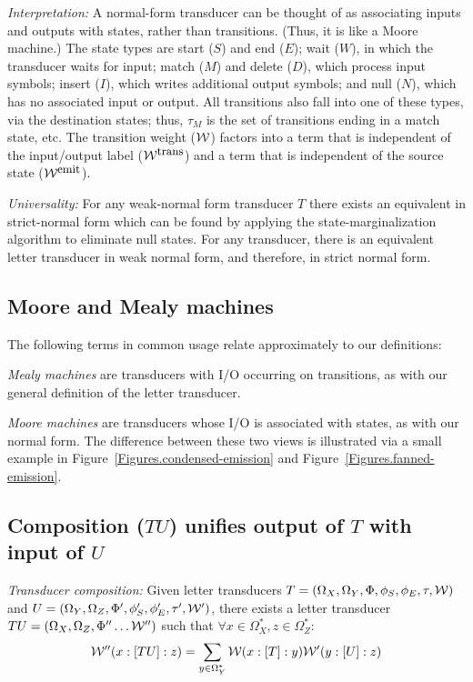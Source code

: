 \documentclass{article}
\newcommand{\seclabel}[1]{\label{sec.#1}}
\newcommand{\figref}[1]{Figure~\ref{Figures.#1}}
\newcommand\wtrans[4]{#1(#2 : [#3] : #4)}
\newcommand\compose{}
\newcommand\States{\Phi}
\newcommand\Transitions{\tau}
\newcommand\startstate{\phi_S}
\newcommand\laststate{\phi_E}
\newcommand\weight{{\cal W}}
\newcommand\weightfunof[1]{\weight_{#1}}
\newcommand\transweightfun[1]{\weightfunof{#1}^{\mbox{\small trans}}}
\newcommand\emitweightfun[1]{\weightfunof{#1}^{\mbox{\small emit}}}
\begin{document}
{\em Interpretation:}
A normal-form transducer can be thought of as associating inputs and outputs with states, rather than transitions.
(Thus, it is like a Moore machine.)
The state types are
 start ($S$) and end ($E$);
 wait ($W$), in which the transducer waits for input;
 match ($M$) and delete ($D$), which process input symbols;
 insert ($I$), which writes additional output symbols; and
 null ($N$), which has no associated input or output.
All transitions also fall into one of these types, via the destination states;
thus, $\Transitions_M$ is the set of transitions ending in a match state, etc.
The transition weight ($\weight$) factors into a term that is independent of the input/output label ($\transweightfun{}$)
and a term that is independent of the source state ($\emitweightfun{}$).

{\em Universality:}
For any weak-normal form transducer $T$ there exists an equivalent in strict-normal form which can be found by applying the state-marginalization algorithm to eliminate null states.
For any transducer, there is an equivalent letter transducer in weak normal form, and therefore, in strict normal form.

\subsection{Moore and Mealy machines}

The following terms in common usage relate approximately to our definitions:

{\em Mealy machines} are transducers with I/O occurring on transitions, as with our general definition of the letter transducer.

{\em Moore machines} are transducers whose I/O is associated with states, as with our normal form.
The difference between these two views is illustrated via a small example in
\figref{condensed-emission} and \figref{fanned-emission}.  

\subsection{Composition ($T\compose U$) unifies output of $T$ with input of $U$}
\seclabel{Composition}

{\em Transducer composition:}
Given letter transducers
 $T = (\Omega_X, \Omega_Y, \States, \startstate, \laststate, \Transitions, \weight)$ and
 $U = (\Omega_Y, \Omega_Z, \States', \startstate', \laststate', \Transitions', \weight')$,
there exists a letter transducer $T\compose U = (\Omega_X, \Omega_Z, \States'' \ldots \weight'')$ 
such that $\forall x \in \Omega_X^\ast, z \in \Omega_Z^\ast$:
\[
\wtrans{\weight''}{x}{T\compose U}{z} = \sum_{y\in\Omega_Y^\ast} \wtrans{\weight}{x}{T}{y} \wtrans{\weight'}{y}{U}{z}
\]
\end{document}
